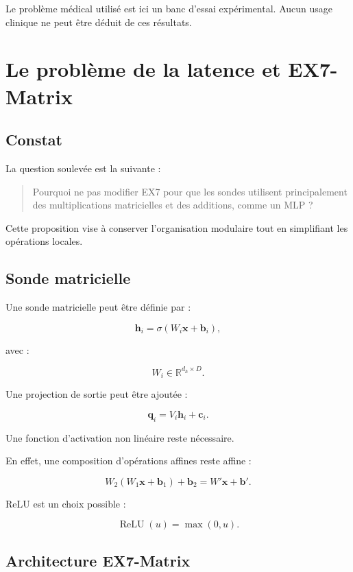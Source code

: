 \documentclass[11pt,a4paper]{report}
\newcommand{\R}{\mathbb{R}}
\newcommand{\ReLU}{\operatorname{ReLU}}
\newcommand{\vect}[1]{\bm{#1}}
\begin{document}
Le problème médical utilisé est ici un banc d'essai
expérimental. Aucun usage clinique ne peut être déduit
de ces résultats.

\chapter{Le problème de la latence et EX7-Matrix}

\section{Constat}

La question soulevée est la suivante :

\begin{quote}
Pourquoi ne pas modifier EX7 pour que les sondes utilisent
principalement des multiplications matricielles et des
additions, comme un MLP ?
\end{quote}

Cette proposition vise à conserver l'organisation modulaire
tout en simplifiant les opérations locales.

\section{Sonde matricielle}

Une sonde matricielle peut être définie par :

\[
\vect{h}_i
=
\sigma(W_i\vect{x}+\vect{b}_i),
\]

avec :

\[
W_i\in\R^{d_h\times D}.
\]

Une projection de sortie peut être ajoutée :

\[
\vect{q}_i
=
V_i\vect{h}_i+\vect{c}_i.
\]

Une fonction d'activation non linéaire reste nécessaire.

En effet, une composition d'opérations affines reste affine :

\[
W_2(W_1\vect{x}+\vect{b}_1)+\vect{b}_2
=
W'\vect{x}+\vect{b}'.
\]

ReLU est un choix possible :

\[
\ReLU(u)=\max(0,u).
\]

\section{Architecture EX7-Matrix}
\end{document}
